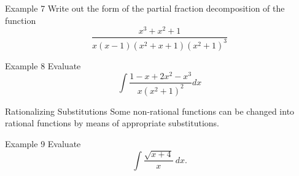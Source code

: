 \documentclass{beamer}
\begin{document}
\begin{frame}{Example 7}
Write out the form of the partial fraction decomposition of the function \[
\dfrac{x^3 +x^2 +1}{x(x-1)(x^2+x+1)(x^2+1)^3}
\]
\end{frame}

\begin{frame}{Example 8}
Evaluate \[
\int \dfrac{1-x+2x^2-x^3}{x(x^2+1)^2}dx
\]
\end{frame}

\begin{frame}{Rationalizing Substitutions}
Some non-rational functions can be changed into rational functions by means of appropriate substitutions. 
\begin{block}{Example 9}
Evaluate \[\int \dfrac{\sqrt{x+4}}{x}~dx.\]
\end{block}
\end{frame}
\end{document}
